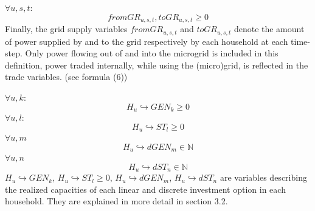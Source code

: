\documentclass[
	11pt,								%
	DIV10,								%
	a4paper,         					%
	oneside,							%
	headheight=20pt,					%
	footheight=20pt,					%
    parskip=full,						%
    listof=totoc,						%
	bibliography=totoc,					%
	index=totoc,						%
]{scrartcl}
\begin{document}
	\\\\
	$\forall u,s,t$:
	\begin{equation}
		fromGR_{u,s,t}, toGR_{u,s,t} \geq 0
	\end{equation}
	Finally, the grid supply variables $fromGR_{u,s,t}$ and $toGR_{u,s,t}$ denote the amount of power supplied by and to the grid respectively by each household at each time-step. Only power flowing out of and into the microgrid is included in this definition, power traded internally, while using the (micro)grid, is reflected in the trade variables. (see formula (6))
	
	$\forall u,k$:
	\begin{equation}
		H_u\hookrightarrow GEN_k \geq 0
	\end{equation}
	$\forall u,l$:
	\begin{equation}
		H_u\hookrightarrow  ST_l \geq 0
	\end{equation}
	$\forall u,m$
	\begin{equation}
		H_u\hookrightarrow d GEN_m \in \mathbb{N}
	\end{equation}
	$\forall u,n$
	\begin{equation}
		H_u\hookrightarrow d ST_n \in \mathbb{N}
	\end{equation}
	$H_u\hookrightarrow GEN_k$, $H_u\hookrightarrow  ST_l \geq 0$, $H_u\hookrightarrow d GEN_m$, $H_u\hookrightarrow d ST_n$ are variables describing the realized capacities of each linear and discrete investment option in each household. They are explained in more detail in section 3.2.
\end{document}
